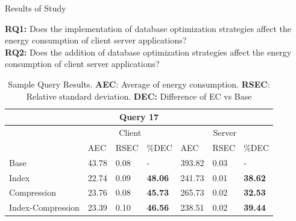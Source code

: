 \documentclass{beamer}
\begin{document}
\small
\begin{frame}{Results of Study}

\textbf{RQ1:} Does the implementation of database optimization strategies affect the energy consumption of client server applications?\\
\textbf{RQ2:} Does the addition of database optimization strategies affect the energy consumption of client server applications?

\scriptsize
\begin{table}[]
\caption{\scriptsize{Sample Query Results. \textbf{AEC}: Average of energy consumption. \textbf{RSEC}: Relative standard deviation. \textbf{DEC:} Difference of EC vs Base }}
\begin{tabular}{|lllllll|}
\hline
\multicolumn{7}{|c|}{Query 17}                                                     \\ \hline
\multicolumn{1}{|l|}{}   & \multicolumn{3}{c|}{Client}                                                          & \multicolumn{3}{c|}{Server}                                      \\ \hline
\multicolumn{1}{|l|}{}   & \multicolumn{1}{l|}{AEC}    & \multicolumn{1}{l|}{RSEC} & \multicolumn{1}{l|}{\%DEC}   & \multicolumn{1}{l|}{AEC}     & \multicolumn{1}{l|}{RSEC} & \%DEC   \\ \hline
\multicolumn{1}{|l|}{Base}  & \multicolumn{1}{l|}{43.78} & \multicolumn{1}{l|}{0.08} & \multicolumn{1}{l|}{-}     & \multicolumn{1}{l|}{393.82}  & \multicolumn{1}{l|}{0.03} & -     \\ \hline
\multicolumn{1}{|l|}{Index}  & \multicolumn{1}{l|}{22.74}  & \multicolumn{1}{l|}{0.09} & \multicolumn{1}{l|}{\textbf{48.06}} & \multicolumn{1}{l|}{241.73}    & \multicolumn{1}{l|}{0.01} & \textbf{38.62} \\ \hline
\multicolumn{1}{|l|}{Compression}  & \multicolumn{1}{l|}{23.76} & \multicolumn{1}{l|}{0.08} & \multicolumn{1}{l|}{\textbf{45.73}}     & \multicolumn{1}{l|}{265.73} & \multicolumn{1}{l|}{0.02} & \textbf{32.53}     \\ \hline
\multicolumn{1}{|l|}{Index-Compression} & \multicolumn{1}{l|}{23.39}  & \multicolumn{1}{l|}{0.10} & \multicolumn{1}{l|}{\textbf{46.56}} & \multicolumn{1}{l|}{238.51}     & \multicolumn{1}{l|}{0.02} & \textbf{39.44} \\ \hline
\end{tabular}

\end{table}
\end{frame}
\end{document}
